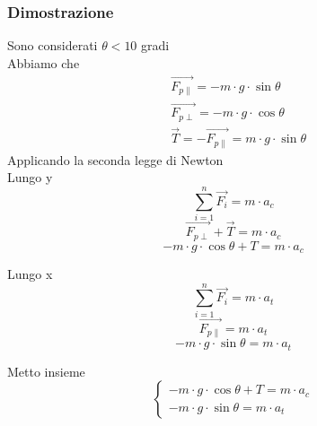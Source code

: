 \documentclass[twoside]{article}
\begin{document}
\subsubsection{Dimostrazione}
Sono considerati $\theta < 10$ gradi\\
Abbiamo che
\begin{align*}
   & \vec{F_{p \parallel}} = -m \cdot g \cdot \sin{\theta}                         \\
   & \vec{F_{p \perp}}     = -m \cdot g \cdot \cos{\theta}                         \\
   & \vec{T}               = -\vec{F_{p \parallel}} = m \cdot g \cdot \sin{\theta}
\end{align*}
Applicando la seconda legge di Newton\\
Lungo y
\begin{equation*}
  \sum_{i=1}^{n} \vec{F_i}                                     = m \cdot a_c
\end{equation*}
\begin{equation*}
  \vec{F_{p \perp}} + \vec{T}                                  = m \cdot a_c
\end{equation*}
\begin{equation*}
  -m \cdot g \cdot \cos{\theta} + T = m \cdot a_c
\end{equation*}

Lungo x
\begin{equation*}
  \sum_{i=1}^{n} \vec{F_i}                                     = m \cdot a_t
\end{equation*}
\begin{equation*}
  \vec{F_{p \parallel}}                                         = m \cdot a_t
\end{equation*}
\begin{equation*}
  - m \cdot g \cdot \sin{\theta}                                  = m \cdot a_t
\end{equation*}

Metto insieme
\begin{equation*}
  \begin{cases}
    -m \cdot g \cdot \cos{\theta} + T = m \cdot a_c \\
    - m \cdot g \cdot \sin{\theta} = m \cdot a_t
  \end{cases}
\end{equation*}
\end{document}

